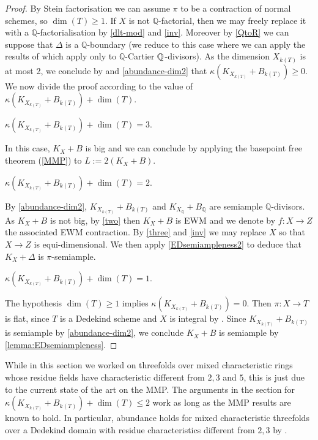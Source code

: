 \begin{proof}
	By Stein factorisation we can assume $\pi$ to be a contraction of normal schemes, so $\dim(T) \geq 1$.
	If $X$ is not $\mathbb{Q}$-factorial, then we may freely replace it with a $\mathbb{Q}$-factorialisation by \autoref{dlt-mod} and \autoref{inv}. Moreover by \autoref{QtoR} we can suppose that $\Delta$ is a $\mathbb{Q}$-boundary (we reduce to this case where we can apply the results of \cite{witaszek2020keels} which apply only to $\mathbb{Q}$-Cartier $\mathbb{Q}$-divisors).
	As the dimension $X_{k(T)}$ is at most 2, we conclude by \cite[Lemma 9.22]{bhatt2020} and \autoref{abundance-dim2} that $\kappa(K_{X_{k(T)}}+B_{k(T)}) \geq 0$. We now divide the proof according to the value of $\kappa(K_{X_{k(T)}}+B_{k(T)})+\dim (T)$.
	
	\begin{case} 
		$\kappa(K_{X_{k(T)}}+B_{k(T)})+\dim (T)=3$.
	\end{case}
	In this case, $K_X+B$ is big and we can conclude by applying the basepoint free theorem (\autoref{MMP}) to $L:=2(K_{X}+B)$.
	
	\begin{case}
		$\kappa(K_{X_{k(T)}}+B_{k(T)})+\dim (T)=2$.
	\end{case}
	By \autoref{abundance-dim2},  $K_{X_{k(T)}}+B_{k(T)}$ and $K_{X_\mathbb{Q}}+B_{\mathbb{Q}}$ are semiample $\mathbb{Q}$-divisors. As $K_X+B$ is not big, by \autoref{two} then $K_X+B$ is EWM and we denote by $f \colon X \to Z$ the associated EWM contraction.
	By \autoref{three} and \autoref{inv} we may replace $X$ so that $X \to Z$ is equi-dimensional. We then apply \autoref{EDsemiampleness2} to deduce that $K_{X}+\Delta$ is $\pi$-semiample.
	
	\begin{case}
		$\kappa(K_{X_{k(T)}}+B_{k(T)})+\dim (T)=1$.
	\end{case} 
	The hypothesis $\dim (T) \geq 1$ implies  $\kappa(K_{X_{k(T)}}+B_{k(T)})=0$. Then $\pi \colon X \to T$ is flat, since $T$ is a Dedekind scheme and $X$ is integral by \cite[Proposition 9.7]{Ha77}. Since $K_{X_{{k(T)}}}+ B_{{k(T)}}$ is semiample by \autoref{abundance-dim2}, we conclude $K_X+B$ is semiample by \autoref{lemma:EDsemiampleness}. 
\end{proof}
	
	\begin{remark}
		While in this section we worked on threefolds over mixed characteristic rings whose residue fields have characteristic different from $2,3$ and $5$, this is just due to the current state of the art on the MMP. 
		The arguments in the section for $\kappa(K_{X_{k(T)}}+B_{k(T)})+\dim(T) \leq 2$ work as long as the MMP results are known to hold.
		In particular, abundance holds for mixed characteristic threefolds over a Dedekind domain with residue characteristics different from $2, 3$ by \cite{XX22}.
	\end{remark}
	
